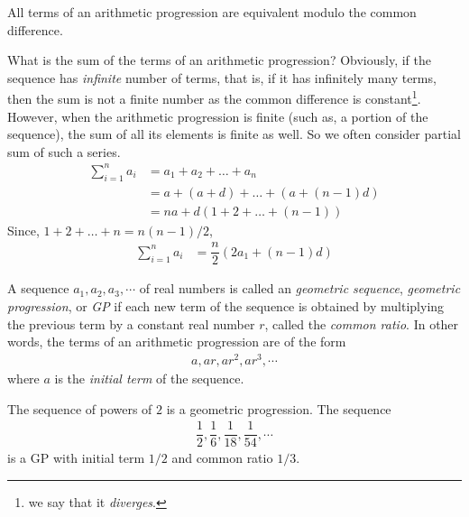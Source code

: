 \documentclass{subfile}
\begin{document}
	\begin{corollary}
		All terms of an arithmetic progression are equivalent modulo the common difference.
	\end{corollary}
What is the sum of the terms of an arithmetic progression? Obviously, if the sequence has \textit{infinite} number of terms, that is, if it has infinitely many terms, then the sum is not a finite number as the common difference is constant\footnote{we say that it \textit{diverges}.}. However, when the arithmetic progression is finite (such as, a portion of the sequence), the sum of all its elements is finite as well. So we often consider partial sum of such a series.
			\begin{align*}
				\sum_{i=1}^{n} a_i
					&= a_1 + a_2 + \ldots + a_n \\
					&= a + (a+d) + \ldots + \left(a+ (n-1)d\right)\\
					&= na + d\left(1+2+\ldots+ (n-1)\right)
			\end{align*}
		Since, $1+2+\ldots+n = n(n-1)/2$,
			\begin{align*}
				\sum_{i=1}^{n} a_i
					& = \dfrac{n}{2} \left(2a_1 + (n-1)d\right)
			\end{align*}

	\begin{definition}
		A sequence $a_1, a_2, a_3, \cdots$ of real numbers is called an \textit{geometric sequence}, \textit{geometric progression}, or \textit{GP} if each new term of the sequence is obtained by multiplying the previous term by a constant real number $r$, called the \textit{common ratio}. In other words, the terms of an arithmetic progression are of the form
			\begin{align*}
				a, ar, ar^2, ar^3, \cdots
			\end{align*}
		where $a$ is the \textit{initial term} of the sequence.
	\end{definition}

	\begin{example}
		The sequence of powers of $2$ is a geometric progression. The sequence
			\begin{align*}
				\dfrac{1}{2}, \dfrac{1}{6}, \dfrac{1}{18}, \dfrac{1}{54}, \cdots
			\end{align*}
		is a GP with initial term $1/2$ and common ratio $1/3$.
	\end{example}
\end{document}
